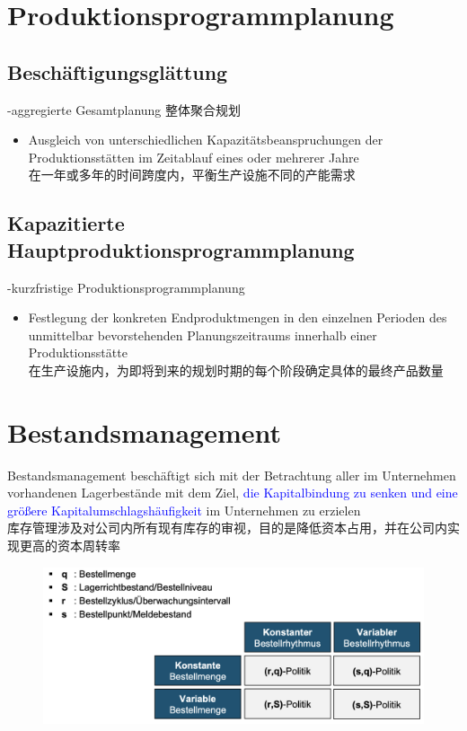 \documentclass[12pt, letterpaper]{article}
\begin{document}
\begin{CJK*}{UTF8}{gbsn}
\begin{itemize}
 
\end{itemize}


\newpage
\section{Produktionsprogrammplanung}
\subsection{Beschäftigungsglättung}
-aggregierte Gesamtplanung 整体聚合规划\\[1mm]
\begin{itemize}
\item Ausgleich von unterschiedlichen Kapazitätsbeanspruchungen der Produktionsstätten im Zeitablauf eines oder mehrerer
Jahre\\[1mm]
在一年或多年的时间跨度内，平衡生产设施不同的产能需求
\end{itemize}

\subsection{Kapazitierte Hauptproduktionsprogrammplanung}
-kurzfristige Produktionsprogrammplanung\\[1mm]
\begin{itemize}
\item Festlegung der konkreten Endproduktmengen in den einzelnen Perioden des unmittelbar bevorstehenden Planungszeitraums innerhalb einer Produktionsstätte\\[1mm]
在生产设施内，为即将到来的规划时期的每个阶段确定具体的最终产品数量
\end{itemize}


\newpage
\section{Bestandsmanagement}
Bestandsmanagement beschäftigt sich mit der Betrachtung aller im Unternehmen vorhandenen Lagerbestände mit dem Ziel, \textcolor{blue}{die Kapitalbindung zu senken und eine größere Kapitalumschlagshäufigkeit} im Unternehmen zu erzielen\\[1mm]
库存管理涉及对公司内所有现有库存的审视，目的是降低资本占用，并在公司内实现更高的资本周转率\\

\begin{figure}[h!]
  \centering %
  \includegraphics[width=0.8\linewidth]{VL71.png}
\end{figure}


\end{CJK*}
\end{document}

